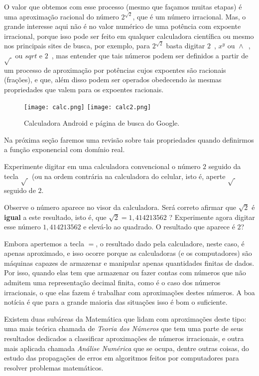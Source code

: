 O valor que obtemos com esse processo (mesmo que façamos muitas etapas) é uma aproximação racional do número $2^{\sqrt{2}}$, que é um número irracional. Mas, o grande interesse aqui não é no valor numérico de uma potência com expoente irracional, porque isso pode ser feito em qualquer calculadora científica ou mesmo nos principais sites de busca, por exemplo, para $2^{\sqrt{2}}$ basta digitar $ \boxed{2}$\ ,  $\boxed{x^y}$ ou $\boxed{\land}$\ ,  $\boxed{\sqrt{\ }}$ ou  $\boxed{sqrt}$ e $\boxed{2}$\ , mas entender que tais números podem ser definidos a partir de um processo de aproximação por potências cujos expoentes são racionais (frações), e que, além disso podem ser operados obedecendo às mesmas propriedades que valem para os expoentes racionais.

\begin{figure}[H]
\centering
\texttt{[image: calc.png]}
\texttt{[image: calc2.png]}
\caption{Calculadora Android e página de busca do Google.}
\end{figure}

Na próxima seção faremos uma revisão sobre tais propriedades quando definirmos a função exponencial com domínio real.

\begin{knowledge}
Experimente digitar em uma calculadora convencional o número $\boxed{2}$ seguido da tecla $\boxed{\sqrt{\ }}$ (ou na ordem contrária na calculadora do celular, isto é, aperte $\boxed{\sqrt{\ }}$ seguido de $\boxed{2}$. 

Observe o número aparece no visor da calculadora. Será correto afirmar que $\sqrt{2}$ é \textbf{igual} a este resultado, isto é, que $\sqrt{2}=1{,}414213562$ ? Experimente agora digitar esse número $1{,}414213562$ e elevá-lo ao quadrado. O resultado que aparece é $2$?

Embora apertemos a tecla $\boxed{=}$, o resultado dado pela calculadore, neste caso, é apenas aproximado, e isso ocorre porque as calculadoras (e os computadores) são máquinas capazes de armazenar e manipular apenas quantidades finitas de dados. Por isso, quando elas tem que armazenar ou fazer contas com números que não admitem uma representação decimal finita, como é o caso dos números irracionais, o que elas fazem é trabalhar com aproximações destes números. A boa notícia é que para a grande maioria das situações isso é bom o suficiente. 

Existem duas subáreas da Matemática que lidam com aproximações deste tipo: uma mais teórica chamada de \textit{Teoria dos Números} que tem uma parte de seus resultados dedicados a classificar aproximações de números irracionais, e outra mais aplicada chamada \textit{Análise Numérica} que se ocupa, dentre outras coisas, do estudo das propagações de erros em algoritmos feitos por computadores para resolver problemas matemáticos.

\end{knowledge}

